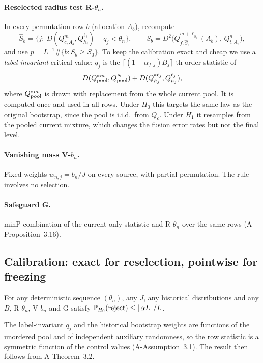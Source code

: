 \documentclass[11pt,a4paper]{article}
\begin{document}
\paragraph{Reselected radius test R-$\theta_n$.} In every permutation row $b$ (allocation $A_b$), recompute
\[
\hat S_b=\{j:\ D(Q^m_{c,A_b},Q^{\ell_j}_{h_j})+q_j<\theta_n\},\qquad S_b=D^2\big(Q^{m+\ell_{\hat S_b}}_{f,\hat S_b}(A_b),\,Q^n_{t,A_b}\big),
\]
and use $p=L^{-1}\#\{b:S_b\ge S_0\}$. To keep the calibration exact and cheap we use a \emph{label-invariant} critical value: $q_j$ is the $\lceil(1-\alpha_{f,j})B_f\rceil$-th order statistic of
\[
D(Q^{\ast m}_{\rm pool},Q^N_{\rm pool})+D(Q^{\ast\ell_j}_{h_j},Q^{\ell_j}_{h_j}),
\]
where $Q^{\ast m}_{\rm pool}$ is drawn with replacement from the whole current pool. It is computed once and used in all rows. Under $H_0$ this targets the same law as the original bootstrap, since the pool is i.i.d.\ from $Q_c$. Under $H_1$ it resamples from the pooled current mixture, which changes the fusion error rates but not the final level.

\paragraph{Vanishing mass V-$b_n$.} Fixed weights $w_{n,j}=b_n/J$ on every source, with partial permutation. The rule involves no selection.

\paragraph{Safeguard G.} minP combination of the current-only statistic and R-$\theta_n$ over the same rows (A-Proposition~3.16).

\subsection{Calibration: exact for reselection, pointwise for freezing}\label{sec:calib}

\begin{proposition}\label{prop:Rlevel}
For any deterministic sequence $(\theta_n)$, any $J$, any historical distributions and any $B$, R-$\theta_n$, V-$b_n$ and G satisfy $\P_{H_0}(\text{reject})\le\lfloor\alpha L\rfloor/L$.
\end{proposition}

The label-invariant $q_j$ and the historical bootstrap weights are functions of the unordered pool and of independent auxiliary randomness, so the row statistic is a symmetric function of the control values (A-Assumption~3.1). The result then follows from A-Theorem~3.2.
\end{document}
